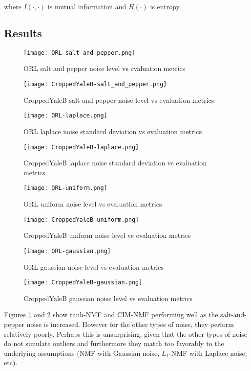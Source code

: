 \documentclass{article} %
\begin{document}
where $I\left(\cdot,\cdot\right)$ is mutual information and $H\left(\cdot\right)$ is entropy.

\subsection{Results}
\begin{figure}
\texttt{[image: ORL-salt\_and\_pepper.png]}
\caption{ORL salt and pepper noise level vs evaluation metrics \label{fig:ORL-salt_and_pepper}}
\end{figure}
\begin{figure}
\texttt{[image: CroppedYaleB-salt\_and\_pepper.png]}
\caption{CroppedYaleB salt and pepper noise level vs evaluation metrics \label{fig:CroppedYaleB-salt_and_pepper}}
\end{figure}

\begin{figure}
\texttt{[image: ORL-laplace.png]}
\caption{ORL laplace noise standard deviation vs evaluation metrics \label{fig:ORL-laplace}}
\end{figure}
\begin{figure}
\texttt{[image: CroppedYaleB-laplace.png]}
\caption{CroppedYaleB laplace noise standard deviation vs evaluation metrics \label{fig:CroppedYaleB-laplace}}
\end{figure}

\begin{figure}
\texttt{[image: ORL-uniform.png]}
\caption{ORL uniform noise level vs evaluation metrics \label{fig:ORL-uniform}}
\end{figure}
\begin{figure}
\texttt{[image: CroppedYaleB-uniform.png]}
\caption{CroppedYaleB uniform noise level vs evaluation metrics \label{fig:CroppedYaleB-uniform}}
\end{figure}

\begin{figure}
\texttt{[image: ORL-gaussian.png]}
\caption{ORL gaussian noise level vs evaluation metrics \label{fig:ORL-gaussian}}
\end{figure}
\begin{figure}
\texttt{[image: CroppedYaleB-gaussian.png]}
\caption{CroppedYaleB gaussian noise level vs evaluation metrics \label{fig:CroppedYaleB-gaussian}}
\end{figure}

Figures \ref{fig:ORL-salt_and_pepper} and \ref{fig:CroppedYaleB-salt_and_pepper} show tanh-NMF and CIM-NMF performing well as the salt-and-pepper noise is increased. However for the other types of noise, they perform relatively poorly. Perhaps this is unsurprising, given that the other types of noise do not simulate outliers and furthermore they match too favorably to the underlying assumptions (NMF with Gaussian noise, $L_1$-NMF with Laplace noise, etc).
\end{document}
